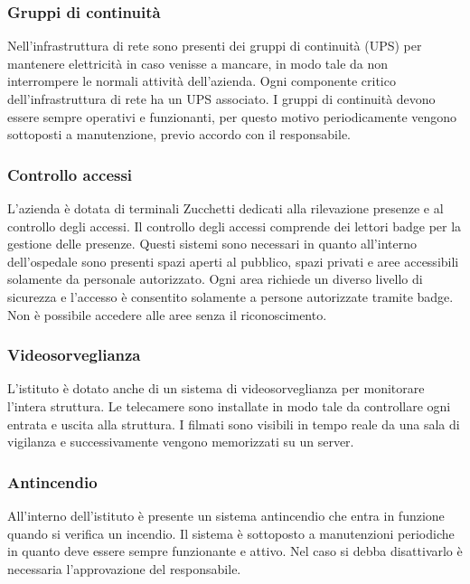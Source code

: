 \documentclass[12pt, a4paper, titlepage]{report}
\begin{document}
			\subsubsection{Gruppi di continuità}
			Nell'infrastruttura di rete sono presenti dei gruppi di continuità (UPS) per mantenere elettricità in caso venisse a mancare, in modo tale da non interrompere le normali attività dell'azienda. Ogni componente critico dell'infrastruttura di rete ha un UPS associato. I gruppi di continuità devono essere sempre operativi e funzionanti, per questo motivo periodicamente vengono sottoposti a manutenzione, previo accordo con il responsabile. 
			
			\subsubsection{Controllo accessi}
			L'azienda è dotata di terminali Zucchetti dedicati alla rilevazione presenze e al controllo degli accessi.
			Il controllo degli accessi comprende dei lettori badge per la gestione delle presenze. 
			Questi sistemi sono necessari in quanto all'interno dell'ospedale sono presenti spazi aperti al pubblico, spazi privati e aree accessibili solamente da personale autorizzato. Ogni area richiede un diverso livello di sicurezza e l'accesso è consentito solamente a persone autorizzate tramite badge. Non è possibile accedere alle aree senza il riconoscimento.
			
			\subsubsection{Videosorveglianza}
			L'istituto è dotato anche di un sistema di videosorveglianza per monitorare l'intera struttura. Le telecamere sono installate in modo tale da controllare ogni entrata e uscita alla struttura. I filmati sono visibili in tempo reale da una sala di vigilanza e successivamente vengono memorizzati su un server.
			
			\subsubsection{Antincendio}
			All'interno dell'istituto è presente un sistema antincendio che entra in funzione quando si verifica un incendio. Il sistema è sottoposto a manutenzioni periodiche in quanto deve essere sempre funzionante e attivo. Nel caso si debba disattivarlo è necessaria l'approvazione del responsabile.
			
			
\end{document}
